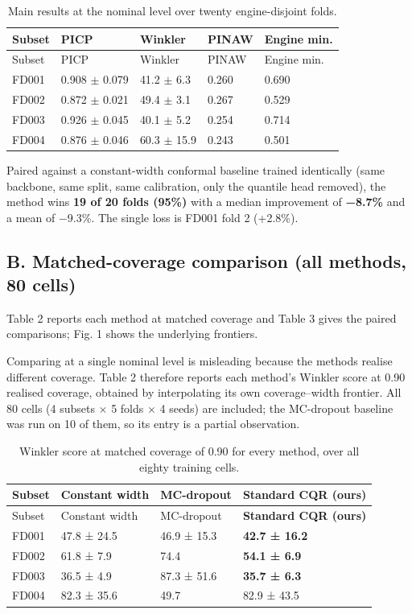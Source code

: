 \begin{longtable}[]{@{}lllll@{}}
\caption{Main results at the nominal level over twenty engine-disjoint folds.}\tabularnewline
\toprule\noalign{}
Subset & PICP & Winkler & PINAW & Engine min. \\
\midrule\noalign{}
\endfirsthead
\toprule\noalign{}
Subset & PICP & Winkler & PINAW & Engine min. \\
\midrule\noalign{}
\endhead
\bottomrule\noalign{}
\endlastfoot
FD001 & 0.908 \(\pm\) 0.079 & 41.2 \(\pm\) 6.3 & 0.260 & 0.690 \\
FD002 & 0.872 \(\pm\) 0.021 & 49.4 \(\pm\) 3.1 & 0.267 & 0.529 \\
FD003 & 0.926 \(\pm\) 0.045 & 40.1 \(\pm\) 5.2 & 0.254 & 0.714 \\
FD004 & 0.876 \(\pm\) 0.046 & 60.3 \(\pm\) 15.9 & 0.243 & 0.501 \\
\end{longtable}

Paired against a constant-width conformal baseline trained identically (same backbone, same split, same calibration, only the quantile head removed), the method wins \textbf{19 of 20 folds (95\%)} with a median improvement of \textbf{−8.7\%} and a mean of −9.3\%. The single loss is FD001 fold 2 (+2.8\%).

\subsection{B. Matched-coverage comparison (all methods, 80 cells)}\label{b.-matched-coverage-comparison-all-methods-80-cells}

Table 2 reports each method at matched coverage and Table 3 gives the paired comparisons; Fig. 1 shows the underlying frontiers.

Comparing at a single nominal level is misleading because the methods realise different coverage. Table 2 therefore reports each method's Winkler score at 0.90 realised coverage, obtained by interpolating its own coverage--width frontier. All 80 cells (4 subsets × 5 folds × 4 seeds) are included; the MC-dropout baseline was run on 10 of them, so its entry is a partial observation.

\begin{longtable}[]{@{}llll@{}}
\caption{Winkler score at matched coverage of 0.90 for every method, over all eighty training cells.}\tabularnewline
\toprule\noalign{}
Subset & Constant width & MC-dropout & \textbf{Standard CQR (ours)} \\
\midrule\noalign{}
\endfirsthead
\toprule\noalign{}
Subset & Constant width & MC-dropout & \textbf{Standard CQR (ours)} \\
\midrule\noalign{}
\endhead
\bottomrule\noalign{}
\endlastfoot
FD001 & 47.8 ± 24.5 & 46.9 ± 15.3 & \textbf{42.7 ± 16.2} \\
FD002 & 61.8 ± 7.9 & 74.4 & \textbf{54.1 ± 6.9} \\
FD003 & 36.5 ± 4.9 & 87.3 ± 51.6 & \textbf{35.7 ± 6.3} \\
FD004 & 82.3 ± 35.6 & 49.7 & 82.9 ± 43.5 \\
\end{longtable}


